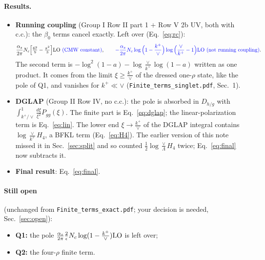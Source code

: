 \documentclass[10pt]{article}
\numberwithin{equation}{section}
\newcommand{\new}[1]{{\color{blue}#1}}
\begin{document}
\paragraph{Results.}
\begin{itemize}
\item \textbf{Running coupling} (Group I Row II part 1 $+$ Row V 2b UV, both with c.c.): the $\beta_0$ terms cancel exactly. Left over (Eq.~\eqref{eq:rc}):
\[\frac{\alpha_s}{2\pi}N_c\Big[\tfrac{67}{9}-\tfrac{\pi^2}{3}\Big]{\rm LO}\ \new{\text{(CMW constant)}},\qquad \new{-\frac{\alpha_s}{2\pi}N_c\log\Big(1-\frac{k^+}{\vee}\Big)\log\Big(\frac{\vee}{k^+}-1\Big){\rm LO}\ \text{(not running coupling)}}.\]
\new{The second term is $-\log^2(1-a)-\log\frac{\vee}{k^+}\log(1-a)$ written as one product. It comes from the limit $\xi\ge\frac{k^+}{\vee}$ of the dressed one-$\rho$ state, like the pole of Q1, and vanishes for $k^+\ll\vee$ (\texttt{Finite\_terms\_singlet.pdf}, Sec.~1).}
\item \textbf{DGLAP} (Group II Row IV, no c.c.): the pole is absorbed in $D_{h/g}$ with $\int_{k^+/\vee}^1\frac{d\xi}{\xi^2}P_{gg}(\xi)$. The finite part is Eq.~\eqref{eq:dglap}; the linear-polarization term is Eq.~\eqref{eq:lin}.
\new{The lower end $\xi\to\frac{k^+}{\vee}$ of the DGLAP integral contains $\log\frac{\vee}{k^+}H_4$, a BFKL term (Eq.~\eqref{eq:H4}). The earlier version of this note missed it in Sec.~\ref{sec:split} and so counted $\frac12\log\frac{\vee}{\Lambda}H_4$ twice; Eq.~\eqref{eq:final} now subtracts it.}
\item \textbf{Final result}: Eq.~\eqref{eq:final}.
\end{itemize}

\paragraph{Still open} (unchanged from \texttt{Finite\_terms\_exact.pdf}; your decision is needed, Sec.~\ref{sec:open}):
\begin{itemize}
\item \textbf{Q1:} the pole $\frac{\alpha_s}{2\pi}\frac2\epsilon N_c\log(1-\frac{k^+}{\vee}){\rm LO}$ is left over;
\item \textbf{Q2:} the four-$\rho$ finite term.
\end{itemize}

\end{document}
